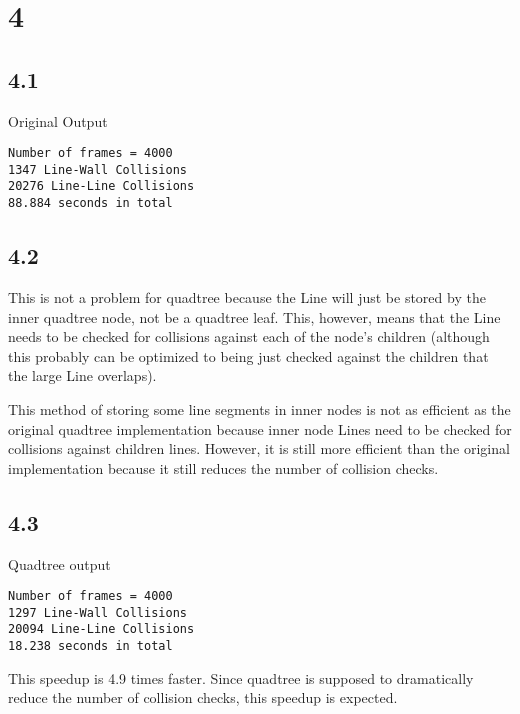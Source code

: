 \documentclass[12pt]{article}
\begin{document}
\maketitle
\section{4}


\subsection{4.1}
Original Output
\begin{verbatim}
Number of frames = 4000
1347 Line-Wall Collisions
20276 Line-Line Collisions
88.884 seconds in total
\end{verbatim}


\subsection{4.2}
This is not a problem for quadtree because the Line will just be stored by the 
inner quadtree node, not be a quadtree leaf.  This, however, means that the 
Line needs to be checked for collisions against each of the node's children 
(although this probably can be optimized to being just checked against the 
children that the large Line overlaps).  

This method of storing some line segments in inner nodes is not as 
efficient as the original quadtree implementation because inner node Lines need 
to be checked for collisions against children lines.  However, it is still more 
efficient than the original implementation because it still reduces the number of 
collision checks.  


\subsection{4.3}
Quadtree output
\begin{verbatim}
Number of frames = 4000
1297 Line-Wall Collisions
20094 Line-Line Collisions
18.238 seconds in total
\end{verbatim}
This speedup is 4.9 times faster.  Since quadtree is supposed to dramatically 
reduce the number of collision checks, this speedup is expected.  
\end{document}
